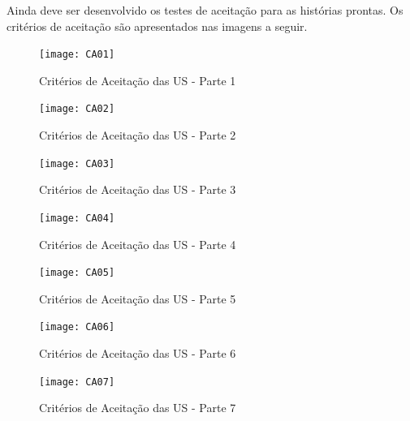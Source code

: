 		Ainda deve ser desenvolvido os testes de aceitação para as histórias prontas. Os critérios de aceitação são apresentados nas imagens a seguir.

		\begin{figure}[h]
			\centering
			\texttt{[image: CA01]}
			\caption{Critérios de Aceitação das US - Parte 1}
			\label{CA01}
		\end{figure}

		\begin{figure}[h]
			\centering
			\texttt{[image: CA02]}
			\caption{Critérios de Aceitação das US - Parte 2}
			\label{CA02}
		\end{figure}

		\begin{figure}[h]
			\centering
			\texttt{[image: CA03]}
			\caption{Critérios de Aceitação das US - Parte 3}
			\label{CA03}
		\end{figure}

		\begin{figure}[h]
			\centering
			\texttt{[image: CA04]}
			\caption{Critérios de Aceitação das US - Parte 4}
			\label{CA04}
		\end{figure}

		\begin{figure}[h]
			\centering
			\texttt{[image: CA05]}
			\caption{Critérios de Aceitação das US - Parte 5}
			\label{CA05}
		\end{figure}

		\begin{figure}[h]
			\centering
			\texttt{[image: CA06]}
			\caption{Critérios de Aceitação das US - Parte 6}
			\label{CA06}
		\end{figure}

		\begin{figure}[h]
			\centering
			\texttt{[image: CA07]}
			\caption{Critérios de Aceitação das US - Parte 7}
			\label{CA01}
		\end{figure}





	




